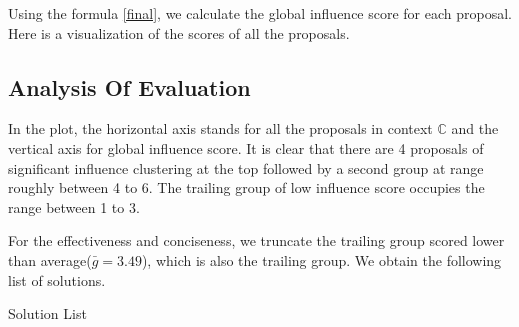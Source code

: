 Using the formula \ref{final}, we calculate the global influence score for each proposal. Here is a visualization of the scores of all the proposals.

\begin{figure}[ht]
\centering
{}
\end{figure}

\subsection{Analysis Of Evaluation}

In the plot, the horizontal axis stands for all the proposals in context $\mathbb{C}$ and the vertical axis for global influence score. It is clear that there are 4 proposals of significant influence clustering at the top followed by a second group at range roughly between 4 to 6. The trailing group of low influence score occupies the range between 1 to 3.

For the effectiveness and conciseness, we truncate the trailing group scored lower than average($\bar{g}=3.49$), which is also the trailing group. We obtain the following list of solutions.

\begin{table}[ht]
\caption{Solution List}
\label{tab:solution}
\end{table}

